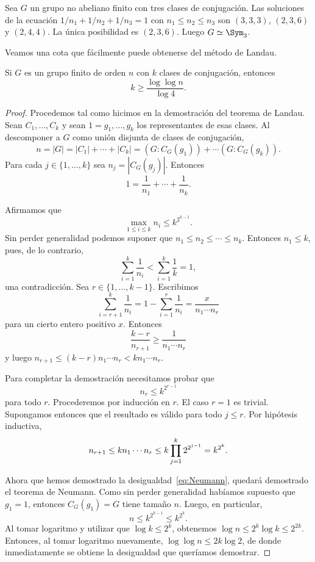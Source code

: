 \begin{example}
  Sea $G$ un grupo no abeliano finito con tres clases de conjugación. Las
  soluciones de la ecuación $1/n_1+1/n_2+1/n_3=1$ con $n_1\leq n_2\leq n_3$ son
  $(3,3,3)$, $(2,3,6)$ y $(2,4,4)$. La única posibilidad es $(2,3,6)$. Luego
  $G\simeq\Sym_3$.
\end{example}

Veamos una cota que fácilmente 
puede obtenerse del método de Landau.

\begin{theorem}[Neumann]
Si $G$ es un grupo finito de orden $n$ con $k$ 
clases de conjugación, entonces
\[
k\geq\frac{\log\log n}{\log 4}.
\]
\end{theorem}

\begin{proof}
Procedemos tal como hicimos en la demostración del teorema de Landau. 
Sean $C_1,\dots,C_k$ y sean $1=g_1,\dots,g_k$ los representantes de esas clases.
Al descomponer a $G$ como unión disjunta de clases de conjugación, 
\[
n=|G|=|C_1|+\cdots+|C_k|=(G:C_G(g_1))+\cdots(G:C_G(g_k)).
\]
Para cada $j\in\{1,\dots,k\}$ sea $n_j=|C_G(g_j)|$. Entonces 
\[
	1=\frac{1}{n_1}+\cdots+\frac{1}{n_k}.
\]

Afirmamos que 
\[
\max_{1\leq i\leq k}n_i\leq k^{2^{k-1}}.
\]
Sin perder generalidad podemos suponer que $n_1\leq n_2\leq\cdots\leq n_k$. Entonces
$n_1\leq k$, pues, de lo contrario, 
\[
\sum_{i=1}^k\frac{1}{n_i}<\sum_{i=1}^k\frac{1}{k}=1,
\]
una contradicción. Sea $r\in\{1,\dots,k-1\}$. Escribimos
\[
\sum_{i=r+1}^k\frac{1}{n_i}=1-\sum_{i=1}^r\frac{1}{n_i}=\frac{x}{n_1\cdots n_r}
\]
para un cierto entero positivo $x$. Entonces
\[
\frac{k-r}{n_{r+1}}\geq\frac{1}{n_1\cdots n_r}
\]
y luego $n_{r+1}\leq (k-r)n_1\cdots n_r<kn_1\cdots n_r$.

Para completar la demostración necesitamos probar que 
\begin{equation}
    \label{eq:Neumann}
    n_r\leq k^{2^{r-1}}
\end{equation}
para todo $r$. 
Procederemos por inducción en $r$. El caso $r=1$ es trivial. Supongamos entonces que 
el resultado es válido
para todo $j\leq r$. Por hipótesis inductiva, 
\[
n_{r+1}\leq kn_1\cdots n_r\leq k\prod_{j=1}^k2^{2^{j-1}}=k^{2^k}.\qedhere
\]

Ahora que hemos demostrado la desigualdad~\eqref{eq:Neumann}, quedará 
demostrado el teorema de Neumann. Como sin perder generalidad habíamos supuesto 
que $g_1=1$, entonces 
$C_G(g_1)=G$ tiene tamaño $n$. Luego, en particular, 
\[
n\leq k^{2^{k-1}}\leq k^{2^k}.
\]
Al tomar logaritmo y utilizar que $\log k\leq 2^k$, obtenemos 
$\log n\leq 2^k\log k\leq 2^{2k}$.  
Entonces, al tomar logaritmo nuevamente, 
$\log\log n\leq 2k\log 2$, de donde inmediatamente se obtiene 
la desigualdad que queríamos demostrar.
\end{proof}

